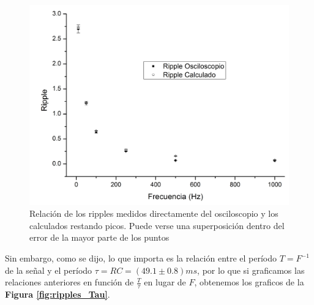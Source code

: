 \documentclass[11pt,a4paper]{article}
\begin{document}
\begin{figure}[H]
\centering
\includegraphics[scale=0.35]{ripples_media}
   \caption{Relación de los ripples medidos directamente del osciloscopio y los calculados restando picos. Puede verse una superposición dentro del error de la mayor parte de los puntos}
   \label{fig:ripples_media}
\end{figure}

Sin embargo, como se dijo, lo que importa es la relación entre el período $T = F^{-1}$ de la señal y el período $\tau = RC = (49.1 \pm 0.8)ms$, por lo que si graficamos las relaciones anteriores en función de $\frac{T}{\tau}$ en lugar de $F$, obtenemos los graficos de la \textbf{Figura \ref{fig:ripples_Tau}}.
\end{document}
